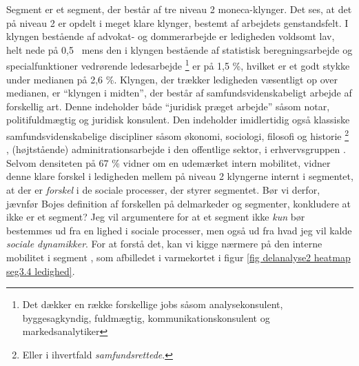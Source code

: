 Segment  er et segment, der består af tre niveau 2 moneca-klynger. Det ses, at det på niveau 2 er opdelt i meget klare klynger, bestemt af arbejdets genstandsfelt. I klyngen bestående af advokat- og dommerarbejde er ledigheden voldsomt lav, helt nede på 0,5 \, mens den i klyngen bestående af statistisk beregningsarbejde og specialfunktioner vedrørende ledesarbejde%
%
\footnote{ Det dækker en række forskellige jobs såsom analysekonsulent, byggesagkyndig, fuldmægtig, kommunikationskonsulent og markedsanalytiker}%
%
er på 1,5 \%, hvilket er et godt stykke under medianen på 2,6 \%. Klyngen, der trækker ledigheden væsentligt op over medianen, er “klyngen i midten”, der består af samfundsvidenskabeligt arbejde af forskellig art. Denne indeholder både “juridisk præget arbejde” såsom notar, politifuldmægtig og juridisk konsulent. Den indeholder imidlertidig også klassiske samfundsvidenskabelige discipliner såsom økonomi, sociologi, filosofi og historie%
%
\footnote{ Eller i ihvertfald \emph{samfundsrettede}.}%
%
, (højtstående) adminitrationsarbejde i den offentlige sektor, i erhvervsgruppen . Selvom densiteten på 67 \% vidner om en udemærket intern mobilitet, vidner denne klare forskel i ledigheden mellem på niveau 2 klyngerne internt i segmentet, at der er \emph{forskel} i de sociale processer, der styrer segmentet. Bør vi derfor, jævnfør Bojes definition af forskellen på delmarkeder og segmenter, konkludere at  ikke er et segment? Jeg vil argumentere for at et segment ikke \emph{kun} bør bestemmes ud fra en lighed i sociale processer, men også ud fra hvad jeg vil kalde \emph{sociale dynamikker}. For at forstå det, kan vi kigge nærmere på den interne mobilitet i segment , som afbilledet i varmekortet i figur \ref{fig delanalyse2 heatmap seg3.4 ledighed}. 

